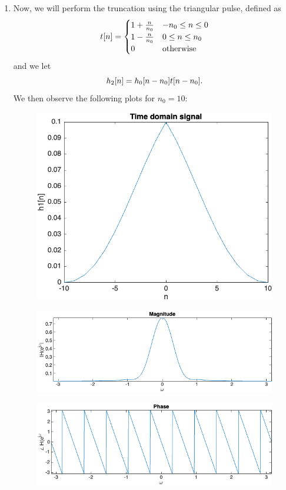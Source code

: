 \documentclass[12pt]{article}
\begin{document}
\begin{enumerate}[label=\textbf{\alph*)}, leftmargin=2.6em]
\item Now, we will perform the truncation using the triangular pulse, defined as
\begin{equation} \notag
    t[n]=
    \begin{cases}
        1+\frac{n}{n_0} & -n_0\le n\le 0\\
        1-\frac{n}{n_0} & 0\le n\le n_0\\
        0 & \text{otherwise}
    \end{cases}
\end{equation}
and we let
\begin{equation} \notag
    h_2[n]=h_0[n-n_0]t[n-n_0].
\end{equation}
We then observe the following plots for $n_0=10$:
\begin{figure} [H]
    \centering
    \includegraphics[width=0.75\linewidth]{10.png}
\end{figure}
\begin{figure} [H]
    \centering
    \includegraphics[width=0.75\linewidth]{11.png}
\end{figure}
\begin{figure} [H]
    \centering
    \includegraphics[width=0.75\linewidth]{12.png}

\end{figure}
\end{enumerate}
\end{document}
